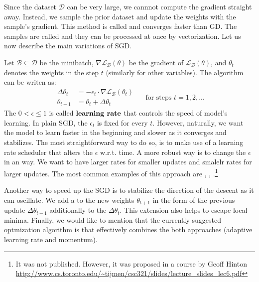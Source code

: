 Since the dataset $\mathcal{D}$ can be very large, we cannnot compute the
gradient straight away. Instead, we sample the prior dataset and update the
weights with the sample's gradient. This method is called  and converges faster than GD. The samples are called
 and they can be processed at once by vectorization. Let us now
describe the main variations of SGD.

 Let $\mathcal{B} \subseteq \mathcal{D}$ be
the minibatch, $\nabla\mathcal{L_\mathcal{B}(\theta)}$ be the gradient of
$\mathcal{L}_\mathcal{B}(\theta)$, and $\theta_t$ denotes the weights in the
step $t$ (similarly for other variables). The algorithm can be writen as:
$$
    \begin{array}{rl}
        \Delta\theta_{t} & = - \epsilon_{t} \cdot \nabla{\mathcal{L}_\mathcal{B}(\theta_{t})} \\
        \theta_{t+1}     & = \theta_{t} + \Delta\theta_{t}
    \end{array}
    \quad \text{ for steps } t = 1,2,...
$$
The $0 < \epsilon \leq 1$ is called $\textbf{learning rate}$ that controls the
speed of model's learning. In plain SGD, the $\epsilon_t$ is fixed for every
$t$. However, naturally, we want the model to learn faster in the beginning and
slower as it converges and stabilizes. The most straightforward way to do so, is
to make use of a learning rate scheduler that alters the $\epsilon$ w.r.t. time.
A more robust way is to change the $\epsilon$ in an  way. We want
to have larger rates for smaller updates and smalelr rates for larger updates.
The most common examples of this approach are  \cite{adagrad},
 \cite{adadelta}, .\footnote{It was not published.
    However, it was proposed in a course by Geoff Hinton \url{
        http://www.cs.toronto.edu/~tijmen/csc321/slides/lecture_slides_lec6.pdf}
}

Another way to speed up the SGD is to stabilize the direction of the descent as
it can oscillate. We add a  to the new weights $\theta_{t+1}$ in
the form of the previous update $\Delta\theta_{t-1}$ additionally to the
$\Delta\theta_{t}$. This extension also helps to escape local minima. Finally,
we would like to mention that the currently suggested optmization algorithm is
 \cite{adam} that effectively combines the both approaches (adaptive
learning rate and momentum).

